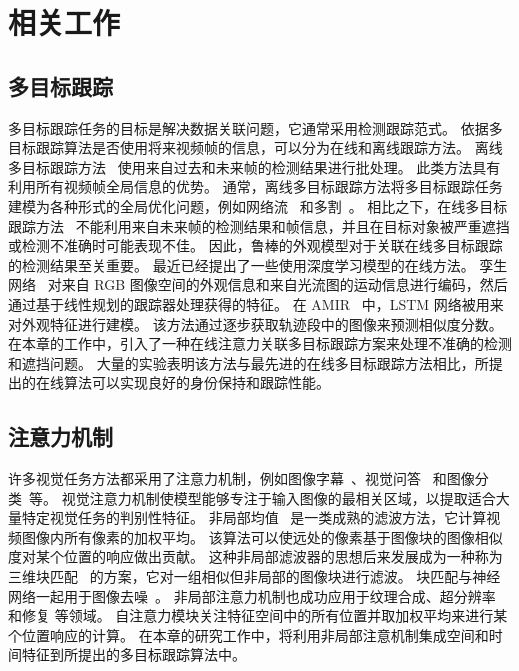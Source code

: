\section{相关工作}
\subsection{多目标跟踪}
多目标跟踪任务的目标是解决数据关联问题，它通常采用检测跟踪范式。
依据多目标跟踪算法是否使用将来视频帧的信息，可以分为在线和离线跟踪方法。
离线多目标跟踪方法~\cite{b2,b17} 使用来自过去和未来帧的检测结果进行批处理。
此类方法具有利用所有视频帧全局信息的优势。
通常，离线多目标跟踪方法将多目标跟踪任务建模为各种形式的全局优化问题，例如网络流~\cite{b17} 和多割~\cite{b2}。
相比之下，在线多目标跟踪方法~\cite{b10, PHD_filter} 不能利用来自未来帧的检测结果和帧信息，并且在目标对象被严重遮挡或检测不准确时可能表现不佳。
因此，鲁棒的外观模型对于关联在线多目标跟踪的检测结果至关重要。
最近已经提出了一些使用深度学习模型的在线方法\cite{b10,b23,b24}。 
孪生网络~\cite{b1} 对来自 RGB 图像空间的外观信息和来自光流图的运动信息进行编码，然后通过基于线性规划的跟踪器处理获得的特征。
在 AMIR~\cite{b23} 中，LSTM 网络被用来对外观特征进行建模。
该方法通过逐步获取轨迹段中的图像来预测相似度分数。
在本章的工作中，引入了一种在线注意力关联多目标跟踪方案来处理不准确的检测和遮挡问题。
大量的实验表明该方法与最先进的在线多目标跟踪方法相比，所提出的在线算法可以实现良好的身份保持和跟踪性能。

\subsection{注意力机制}
许多视觉任务方法都采用了注意力机制，例如图像字幕~\cite{b25}、视觉问答~\cite{b27} 和图像分类~\cite{b29}等。
视觉注意力机制使模型能够专注于输入图像的最相关区域，以提取适合大量特定视觉任务的判别性特征。
非局部均值~\cite{b30} 是一类成熟的滤波方法，它计算视频图像内所有像素的加权平均。
该算法可以使远处的像素基于图像块的图像相似度对某个位置的响应做出贡献。
这种非局部滤波器的思想后来发展成为一种称为三维块匹配~\cite{b31} 的方案，它对一组相似但非局部的图像块进行滤波。
块匹配与神经网络一起用于图像去噪~\cite{b33}。
非局部注意力机制也成功应用于纹理合成\cite{b34}、超分辨率\cite{b35} 和修复\cite{b36} 等领域。
自注意力模块关注特征空间中的所有位置并取加权平均来进行某个位置响应的计算。
在本章的研究工作中，将利用非局部注意机制集成空间和时间特征到所提出的多目标跟踪算法中。



